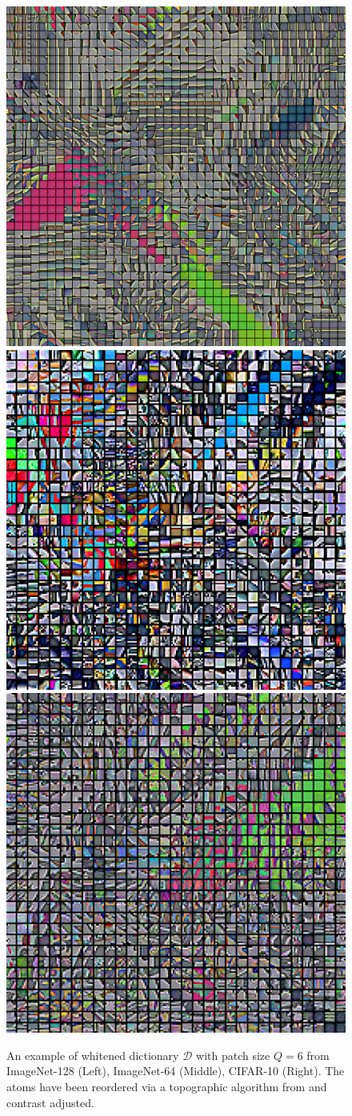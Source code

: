 \documentclass{article}
\begin{document}
\begin{figure}[h]
\centering
  	\includegraphics[width=0.28\linewidth]{figures/topographical_order_more_patches_imagenet128_patches_12}
  	  	\includegraphics[width=0.28\linewidth]{figures/topographical_order_more_patches_imagnet64_patches_6_30Images}
  	  	\includegraphics[width=0.28\linewidth]{figures/topographical_order_more_patches_cifar10_patches_6_30images}
\caption{An example of whitened dictionary  $\mathcal{D}$ with patch size $Q=6$ from ImageNet-128 (Left), ImageNet-64 (Middle), CIFAR-10 (Right). The atoms have been reordered via a topographic algorithm from \citet{Montobbio:2019} and contrast adjusted.}
\label{dico}
\end{figure}

\vspace{-0.1cm}
\end{document}
